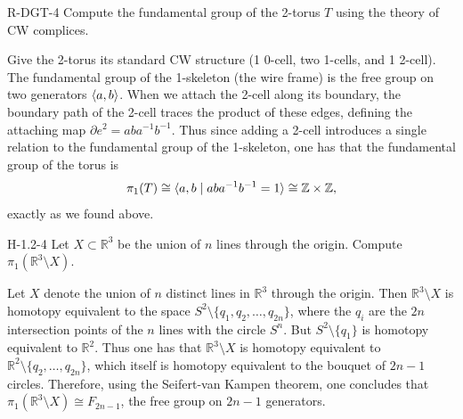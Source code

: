 \documentclass{article}
\begin{document}
	\begin{prb}{R-DGT-4}
		Compute the fundamental group of the 2-torus $T$ using the theory of CW complices. 
	\end{prb}
	Give the 2-torus its standard CW structure (1 0-cell, two 1-cells, and 1 2-cell). The fundamental group of the 1-skeleton (the wire frame) is the free group on two generators $\braket{a,b}$. When we attach the 2-cell along its boundary, the boundary path of the 2-cell traces the product of these edges, defining the attaching map $\partial e^2 = aba^{-1}b^{-1}$. Thus since adding a 2-cell introduces a single relation to the fundamental group of the 1-skeleton, one has that the fundamental group of the torus is 
	\begin{equation*}
		\pi_1(T) \cong \braket{a,b \mid aba^{-1}b^{-1} = 1} \cong \mathbb{Z} \times \mathbb{Z}, 
	\end{equation*}
	exactly as we found above. 
	
	\begin{prb}{H-1.2-4}
		Let $X \subset \mathbb{R}^{3}$ be the union of $n$ lines through the origin. Compute $\pi_{1}(\mathbb{R}^{3} \setminus X)$. 
	\end{prb}
	Let $X$ denote the union of $n$ distinct lines in $\mathbb{R}^{3}$ through the origin. Then $\mathbb{R}^{3}\setminus X$ is homotopy equivalent to the space $S^{2}\setminus \{q_{1}, q_{2}, \ldots, q_{2n}\}$, where the $q_{i}$ are the $2n$ intersection points of the $n$ lines with the circle $S^{n}$. But $S^{2}\setminus \{q_{1}\}$ is homotopy equivalent to $\mathbb{R}^{2}$. Thus one has that $\mathbb{R}^{3}\setminus X$ is homotopy equivalent to $\mathbb{R}^{2}\setminus \{q_{2}, \ldots, q_{2n}\}$, which itself is homotopy equivalent to the bouquet of $2n - 1$ circles. Therefore, using the Seifert-van Kampen theorem, one concludes that $\pi_{1}(\mathbb{R}^{3}\setminus X) \cong F_{2n - 1}$, the free group on $2n - 1$ generators. 
	
\end{document}
